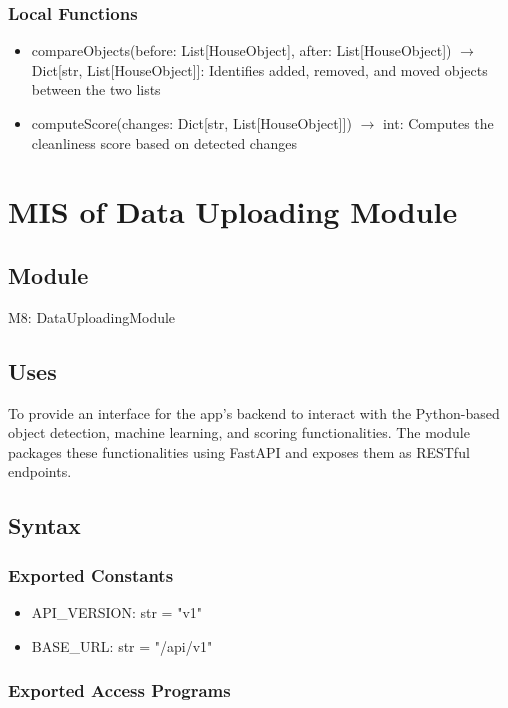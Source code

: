 \documentclass[12pt, titlepage]{article}
\begin{document}
\subsubsection{Local Functions}

\begin{itemize}
  \item compareObjects(before: List[HouseObject], after: List[HouseObject]) $\rightarrow$ Dict[str, List[HouseObject]]: Identifies added, removed, and moved objects between the two lists
  \item computeScore(changes: Dict[str, List[HouseObject]]) $\rightarrow$ int: Computes the cleanliness score based on detected changes
\end{itemize}

\newpage

\section{MIS of Data Uploading Module} \label{Module} 

\subsection{Module}

M8: DataUploadingModule

\subsection{Uses}
To provide an interface for the app's backend to interact with the Python-based object detection, machine learning, and scoring functionalities. The module packages these functionalities using FastAPI and exposes them as RESTful endpoints.

\subsection{Syntax}

\subsubsection{Exported Constants}

\begin{itemize}
  \item API{\_}VERSION: str = "v1"
  \item BASE{\_}URL: str = "/api/v1"
\end{itemize}

\subsubsection{Exported Access Programs}
\end{document}
